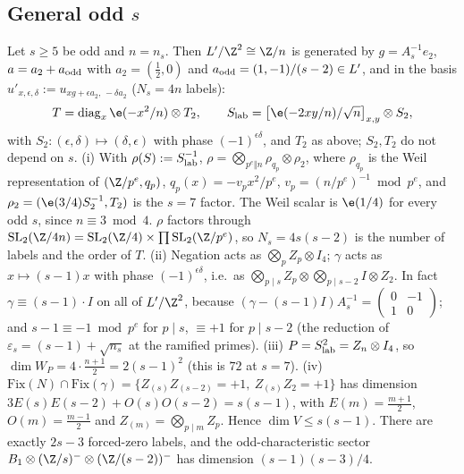 \subsection{General odd $s$}
\begin{theorem}\label{thm:tensorodd}
Let $s\ge5$ be odd and $n=n_s$. Then $L'/\Z^2\cong\Z/n$ is generated by $g=A_s^{-1}e_2$, $a=a_2+a_{\rm odd}$ with $a_2=(\tfrac12,0)$ and
$a_{\rm odd}=(1,-1)/(s-2)\in L'$, and in the basis $u'_{x,\epsilon,\delta}:=u_{xg+\epsilon a_2,\,-\delta a_2}$ ($N_s=4n$ labels):
\[
T=\mathrm{diag}_x\,\e(-x^2/n)\otimes T_2,\qquad S_{\rm lab}=\bigl[\e(-2xy/n)/\sqrt n\bigr]_{x,y}\otimes S_2,
\]
with $S_2:(\epsilon,\delta)\mapsto(\delta,\epsilon)$ with phase $(-1)^{\epsilon\delta}$, and $T_2$ as above; $S_2,T_2$ do not depend on $s$.
(i) With $\rho(S):=S_{\rm lab}^{-1}$, $\rho=\bigotimes_{p^e\Vert n}\rho_{q_p}\otimes\rho_2$, where $\rho_{q_p}$ is the Weil representation of $(\Z/p^e,q_p)$,
$q_p(x)=-v_px^2/p^e$, $v_p=(n/p^e)^{-1}\bmod p^e$, and $\rho_2=(\e(3/4)S_2^{-1},T_2)$ is the $s=7$ factor. The Weil scalar is $\e(1/4)$ for every odd $s$, since
$n\equiv3\bmod4$. $\rho$ factors through $\mathrm{SL}_2(\Z/4n)=\mathrm{SL}_2(\Z/4)\times\prod\mathrm{SL}_2(\Z/p^e)$, so $N_s=4s(s-2)$ is the number of labels and the order of $T$.
(ii) Negation acts as $\bigotimes_pZ_p\otimes I_4$; $\gamma$ acts as $x\mapsto(s-1)x$ with phase $(-1)^{\epsilon\delta}$, i.e.\ as
$\bigotimes_{p\mid s}Z_p\otimes\bigotimes_{p\mid s-2}I\otimes Z_2$. In fact $\gamma\equiv(s-1)\cdot I$ on all of $L'/\Z^2$, because
$(\gamma-(s-1)I)A_s^{-1}=\begin{pmatrix}0&-1\\1&0\end{pmatrix}$; and $s-1\equiv-1\bmod p^e$ for $p\mid s$, $\equiv+1$ for $p\mid s-2$ (the reduction of
$\varepsilon_s=(s-1)+\sqrt{n_s}$ at the ramified primes).
(iii) $P=S_{\rm lab}^2=Z_n\otimes I_4$, so $\dim W_P=4\cdot\tfrac{n+1}2=2(s-1)^2$ (this is $72$ at $s=7$).
(iv) $\mathrm{Fix}(N)\cap\mathrm{Fix}(\gamma)=\{Z_{(s)}Z_{(s-2)}=+1,\ Z_{(s)}Z_2=+1\}$ has dimension $3E(s)E(s-2)+O(s)O(s-2)=s(s-1)$, with $E(m)=\tfrac{m+1}2$,
$O(m)=\tfrac{m-1}2$ and $Z_{(m)}=\bigotimes_{p\mid m}Z_p$. Hence $\dim V\le s(s-1)$. There are exactly $2s-3$ forced-zero labels, and the odd-characteristic
sector $B_1\otimes(\Z/s)^-\otimes(\Z/(s-2))^-$ has dimension $(s-1)(s-3)/4$.
\end{theorem}

